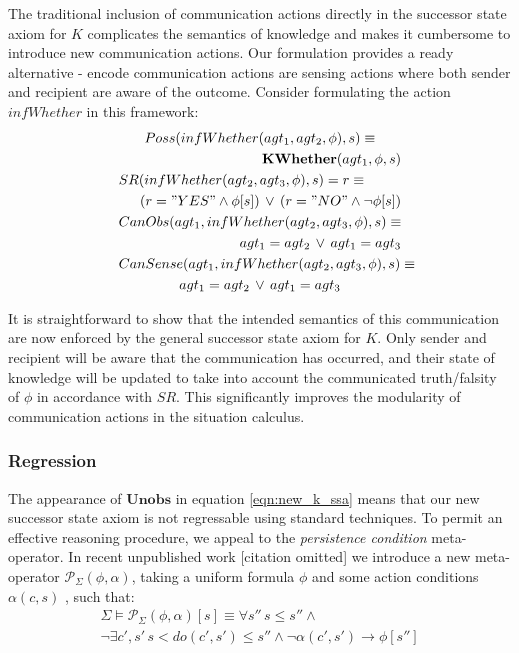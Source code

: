\documentclass[letterpaper]{article}
\begin{document}
The traditional inclusion of communication actions directly in the
successor state axiom for $K$ complicates the semantics of knowledge
and makes it cumbersome to introduce new communication actions. Our
formulation provides a ready alternative - encode communication actions
are sensing actions where both sender and recipient are aware of the
outcome. Consider formulating the action $infWhether$ in this framework:\begin{multline*}
Poss(infWhether(agt_{1},agt_{2},\phi),s)\equiv\\
\shoveright{\mathbf{KWhether}(agt_{1},\phi,s)}\\
\shoveleft{SR(infWhether(agt_{2},agt_{3},\phi),s)=r\equiv}\\
\shoveright{(r="YES"\wedge\phi[s])\,\vee\,(r="NO"\wedge\neg\phi[s])}\\
\shoveleft{CanObs(agt_{1},infWhether(agt_{2},agt_{3},\phi),s)\equiv}\\
\shoveright{agt_{1}=agt_{2}\,\vee\, agt_{1}=agt_{3}}\\
\shoveleft{CanSense(agt_{1},infWhether(agt_{2},agt_{3},\phi),s)\equiv}\\
agt_{1}=agt_{2}\,\vee\, agt_{1}=agt_{3}\end{multline*}


It is straightforward to show that the intended semantics of this
communication are now enforced by the general successor state axiom
for $K$. Only sender and recipient will be aware that the communication
has occurred, and their state of knowledge will be updated to take
into account the communicated truth/falsity of $\phi$ in accordance
with $SR$. This significantly improves the modularity of communication
actions in the situation calculus.


\subsubsection{Regression}

The appearance of $\mathbf{Unobs}$ in equation \ref{eqn:new_k_ssa}
means that our new successor state axiom is not regressable using
standard techniques. To permit an effective reasoning procedure, we
appeal to the \emph{persistence condition} meta-operator. In recent
unpublished work {[}citation omitted] we introduce a new meta-operator
$\mathcal{P}_{\Sigma}(\phi,\alpha)$, taking a uniform formula $\phi$
and some action conditions $\alpha(c,s)$ , such that: \begin{multline}
\Sigma\models\mathcal{P}_{\Sigma}(\phi,\alpha)[s]\equiv\forall s''\, s\leq s''\wedge\\
\neg\exists c',s'\, s<do(c',s')\leq s''\wedge\neg\alpha(c',s')\rightarrow\phi[s'']\label{eqn:P_defn}\end{multline}
\end{document}
